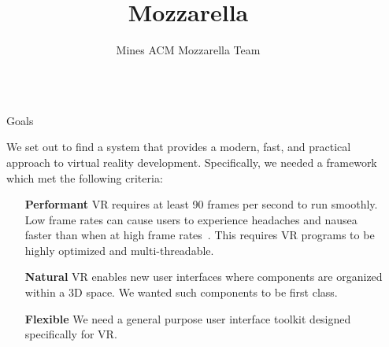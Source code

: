 \documentclass[final]{beamer}
\title{Mozzarella}
\author{Mines ACM Mozzarella Team}
\institute{Department of Computer Science, Colorado School of Mines}
\newlength{\sepwid}
\newlength{\onecolwid}
\begin{document}

    \setlength{\belowcaptionskip}{2ex} %
    \setlength\belowdisplayshortskip{2ex} %

    \begin{frame}[t] %
        \begin{columns}[t]
            \begin{column}{\sepwid}\end{column} %

            \begin{column}{\onecolwid} %

                \begin{block}{Goals}

                    We set out to find a system that provides a modern, fast,
                    and practical approach to virtual reality development.
                    Specifically, we needed a framework which met the
                    following criteria:

                    \begin{enumerate}[leftmargin=8.75cm, labelsep=1cm]

                        \item[\textbf{Performant}] VR requires at least 90
                            frames per second to run smoothly. Low frame rates
                            can cause users to experience headaches and nausea
                            faster than when at high frame rates~\cite{irisVR}.
                            This requires VR programs to be highly optimized and
                            multi-threadable.

                        \item[\textbf{Natural}] VR enables new user interfaces
                            where components are organized within a 3D space. We
                            wanted such components to be first class.

                        \item[\textbf{Flexible}] We need a general purpose user
                            interface toolkit designed specifically for VR.


\end{enumerate}
\end{block}
\end{column}
\end{columns}
\end{frame}
\end{document}
